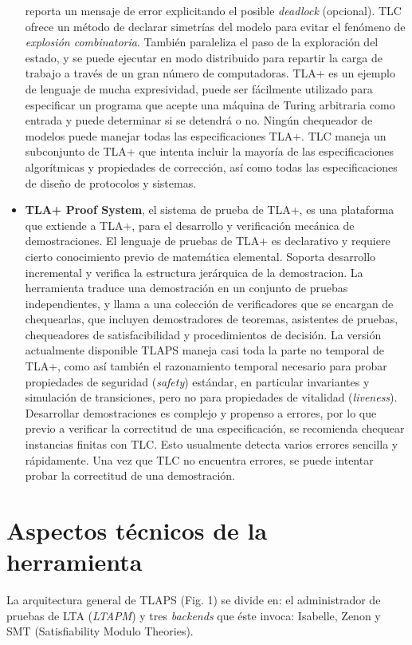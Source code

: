 \documentclass[spanish]{llncs}
\begin{document}
\begin{itemize}
	  reporta un mensaje de error explicitando el posible \textit{deadlock} (opcional).
	  TLC ofrece un método de declarar simetrías del modelo para evitar el fenómeno de \textit{explosión combinatoria}.
	  También paraleliza el paso de la exploración del estado, y se puede ejecutar en modo distribuido para repartir la carga de trabajo a través de un gran número de computadoras.
	  TLA+ es un ejemplo de lenguaje de mucha expresividad, puede ser fácilmente utilizado para especificar un programa que acepte una máquina de Turing arbitraria como entrada y puede determinar si se detendrá o no.
	  Ningún chequeador de modelos puede manejar todas las especificaciones TLA+. TLC maneja un subconjunto de TLA+ que intenta incluir la mayoría de las especificaciones algorítmicas y propiedades de corrección, así como todas las especificaciones de diseño de protocolos y sistemas.
    \item \textbf{TLA+ Proof System}, el sistema de prueba de TLA+, es una plataforma que extiende a TLA+, para el desarrollo y verificación mecánica de demostraciones. 
	  El lenguaje de pruebas de TLA+ es declarativo y requiere cierto conocimiento previo de matemática elemental. Soporta desarrollo incremental y verifica la estructura jerárquica de la demostracion.
	  La herramienta traduce una demostración en un conjunto de pruebas independientes, y llama a una colección de verificadores que se encargan de chequearlas, 
	  que incluyen demostradores de teoremas, asistentes de pruebas, chequeadores de satisfacibilidad y procedimientos de decisión.
	  La versión actualmente disponible TLAPS maneja casi toda la parte no temporal de TLA+, como así también el razonamiento temporal necesario para probar propiedades de seguridad (\textit{safety}) estándar, en particular invariantes y simulación de transiciones, pero no para propiedades de vitalidad (\textit{liveness}).
	  Desarrollar demostraciones es complejo y propenso a errores, por lo que previo a verificar la correctitud de una especificación,
	  se recomienda chequear instancias finitas con TLC. Esto usualmente detecta varios errores sencilla y rápidamente. 
	  Una vez que TLC no encuentra errores, se puede intentar probar la correctitud de una demostración. 
  \end{itemize}  

\section{Aspectos técnicos de la herramienta}
La arquitectura general de TLAPS (Fig. 1) se divide en: el administrador de pruebas de LTA (\textit{LTAPM}) y tres \textit{backends} que éste invoca: Isabelle, Zenon y SMT (Satisfiability Modulo Theories).
\end{document}
